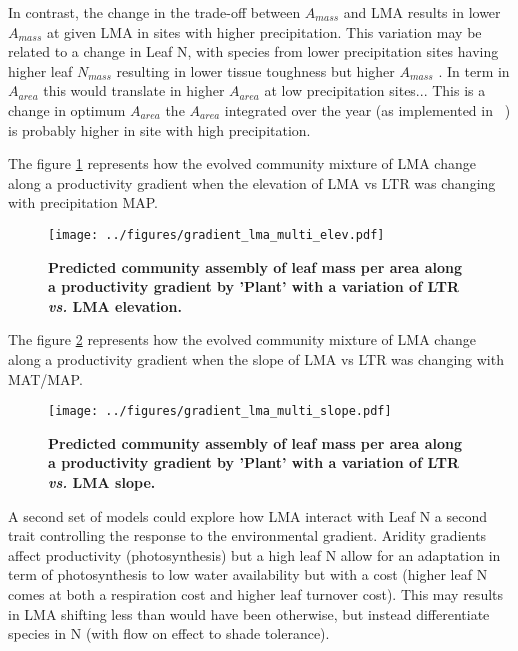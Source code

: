 \documentclass[a4paper,11pt]{article}
\begin{document}
In contrast, the change in the trade-off between $A_{mass}$ and LMA results in lower $A_{mass}$ at given LMA in sites with higher precipitation. This variation may be related to a change in Leaf N, with species from lower precipitation sites having higher leaf $N_{mass}$ resulting in lower tissue toughness but higher $A_{mass}$ \citep{Wright-2002}. In term in $A_{area}$ this would translate in higher $A_{area}$ at low precipitation sites...  This is a change in optimum $A_{area}$ the $A_{area}$ integrated over the year (as implemented in \plant\ ) is probably higher in site with high precipitation.

\clearpage

The figure \ref{fig:lma_map} represents how the evolved community mixture of LMA change along a productivity gradient when the elevation of LMA vs LTR was changing with precipitation MAP.

\begin{figure}[ht]
\centering
\texttt{[image: ../figures/gradient\_lma\_multi\_elev.pdf]}
\caption{\textbf{Predicted community assembly of leaf mass per area along a productivity gradient by 'Plant' with a variation of LTR \textit{vs.} LMA elevation.}
\label{fig:lma_map}}
\end{figure}

The figure \ref{fig:lma_mat_o_map} represents how the evolved community mixture of LMA change along a productivity gradient when the slope of LMA vs LTR was changing with MAT/MAP.

\begin{figure}[ht]
\centering
\texttt{[image: ../figures/gradient\_lma\_multi\_slope.pdf]}
\caption{\textbf{Predicted community assembly of leaf mass per area along a productivity gradient by 'Plant' with a variation of LTR \textit{vs.} LMA slope.}
\label{fig:lma_mat_o_map}}
\end{figure}


\clearpage

A second set of models could explore how LMA interact with Leaf N a second trait controlling the response to the environmental gradient. Aridity gradients affect productivity (photosynthesis) but a
high leaf N allow for an adaptation in term of photosynthesis to low water availability but with a cost (higher leaf N comes at both a respiration cost and higher leaf turnover cost). This may results in LMA shifting less than would have been otherwise, but  instead differentiate species in N (with flow on effect to shade tolerance).
\end{document}
